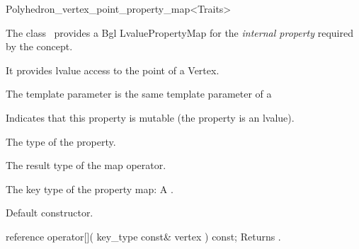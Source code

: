 

\begin{ccRefClass}{Polyhedron_vertex_point_property_map<Traits>}


\ccDefinition

The class \ccRefName\ provides a {\sc Bgl} 
{LvaluePropertyMap} 
for the {\em internal property} 
required by the  concept.

It provides lvalue access to the point of a  Vertex.

The template parameter  is the same  template parameter 
of a 


\ccTypes
    {Indicates that this property is mutable (the property is an lvalue).}
  
    {The type of the property.}
    
    {The result type of the map operator.}
    
  {The key type of the property map: A .}

\ccCreation
{}  %

{Default constructor.}

\ccOperations

\ccMethod
  {reference operator[]( key_type const& vertex ) const;}
  {Returns .}  
    
\ccIsModel
{} 

\end{ccRefClass}


